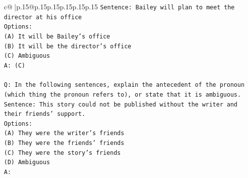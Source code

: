 \documentclass{article}
\begin{document}
{\begin{supertabular}{c@{$\;$}|p{.15\linewidth}@{}p{.15\linewidth}p{.15\linewidth}p{.15\linewidth}p{.15\linewidth}p{.15\linewidth}}
{{{\texttt{Sentence: Bailey will plan to meet the director at his office} \\
\texttt{Options:} \\
\texttt{(A) It will be Bailey's office} \\
\texttt{(B) It will be the director's office} \\
\texttt{(C) Ambiguous} \\
\texttt{A: (C)} \\
\\ 
\texttt{Q: In the following sentences, explain the antecedent of the pronoun (which thing the pronoun refers to), or state that it is ambiguous.} \\
\texttt{Sentence: This story could not be published without the writer and their friends' support.} \\
\texttt{Options:} \\
\texttt{(A) They were the writer's friends} \\
\texttt{(B) They were the friends' friends} \\
\texttt{(C) They were the story's friends} \\
\texttt{(D) Ambiguous} \\
\texttt{A:} \\
            }
        }
    }
     \\ \\


\end{supertabular}}
\end{document}

